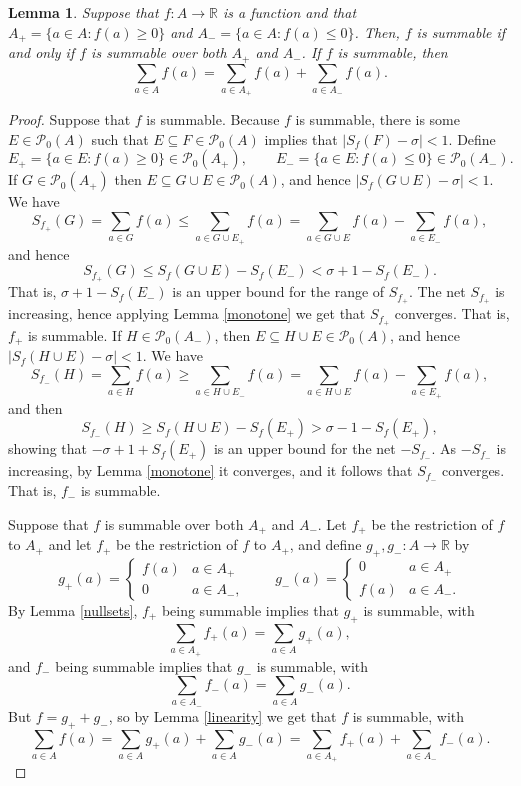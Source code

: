 \documentclass{article}
\newtheorem{lemma}[theorem]{Lemma}
\begin{document}
\begin{lemma}
Suppose that $f:A \to \mathbb{R}$ is a function and that $A_+ = \{a \in A: f(a) \geq 0\}$ and $A_-=\{a \in A: f(a) \leq 0\}$. Then,
$f$ is summable if and only if $f$ is summable over both $A_+$ and $A_-$. If $f$ is summable, then
\[
\sum_{a \in A} f(a) = \sum_{a \in A_+} f(a) + \sum_{a \in A_-} f(a).
\]
\label{positivenegative}
\end{lemma}
\begin{proof}
Suppose that $f$ is summable.
Because $f$ is summable, there is  some $E \in \mathscr{P}_0(A)$ such that $E \subseteq F \in \mathscr{P}_0(A)$ implies that
$|S_f(F)-\sigma|<1$.
Define
\[
E_+ = \{a \in E: f(a) \geq 0\} \in \mathscr{P}_0(A_+), \qquad E_-=\{a \in E: f(a) \leq 0\} \in \mathscr{P}_0(A_-).
\]
 If $G \in \mathscr{P}_0(A_+)$ then
$E \subseteq G \cup E  \in \mathscr{P}_0(A)$, and 
hence 
$|S_f(G \cup E) - \sigma|<1$.
We have
\[
S_{f_+}(G) = \sum_{a \in G} f(a) \leq \sum_{a \in G \cup E_+} f(a) = \sum_{a\in G \cup E} f(a) - \sum_{a \in E_-} f(a),
\]
and hence
\[
S_{f_+}(G) \leq S_f(G \cup E) - S_f(E_-) < \sigma + 1 - S_f(E_-).
\]
That is, $\sigma+1-S_f(E_-)$ is an upper bound for the range of $S_{f_+}$. The net $S_{f_+}$ is increasing, hence applying Lemma \ref{monotone} we get that
$S_{f_+}$ converges. That is, $f_+$ is summable. 
If $H \in \mathscr{P}_0(A_-)$, then $E \subseteq H \cup E \in \mathscr{P}_0(A)$, and hence $|S_f(H \cup E)-\sigma|<1$. We have
\[
S_{f_-}(H) = \sum_{a \in H} f(a) \geq \sum_{a \in H \cup E_-} f(a) = \sum_{a \in H \cup E} f(a) - \sum_{a \in E_+} f(a),
\]
and then
\[
S_{f_-}(H) \geq S_f(H \cup E) - S_f(E_+) > \sigma-1 - S_f(E_+),
\]
showing that $-\sigma+1+S_f(E_+)$ is an upper bound for the net $-S_{f_-}$. As $-S_{f_-}$ is increasing, by Lemma \ref{monotone} it
converges, and it follows that $S_{f_-}$ converges. That is, $f_-$ is summable.

Suppose that $f$ is summable over both $A_+$ and $A_-$.
Let $f_+$ be the restriction of $f$ to $A_+$ and let $f_+$ be the restriction of $f$ to $A_+$, and define
$g_+,g_-:A \to \mathbb{R}$ by
\[
g_+(a)=
\begin{cases}
f(a)&a \in A_+\\
0&a \in A_-,
\end{cases}
\qquad
g_-(a)=\begin{cases}
0&a \in A_+\\
f(a)&a \in A_-.
\end{cases}
\]
By Lemma \ref{nullsets}, $f_+$ being summable implies that $g_+$ is summable, with
\[
\sum_{a \in A_+} f_+(a) = \sum_{a \in A} g_+(a),
\]
 and $f_-$ being summable implies that $g_-$ is summable, with
 \[
 \sum_{a \in A_-} f_-(a) = \sum_{a \in A} g_-(a).
 \]
But $f=g_++g_-$, so by Lemma \ref{linearity} we get that $f$ is summable, with
\[
\sum_{a \in A} f(a) = \sum_{a \in A} g_+(a) + \sum_{a \in A} g_-(a) = \sum_{a \in A_+} f_+(a)  + \sum_{a \in A_-} f_-(a).
\]
\end{proof}
\end{document}
